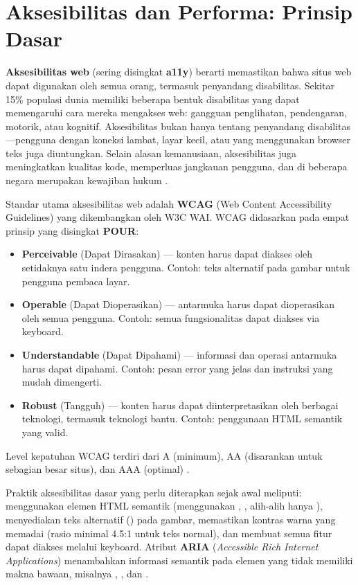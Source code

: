 \section{Aksesibilitas dan Performa: Prinsip Dasar}
\textbf{Aksesibilitas web} (sering disingkat \textbf{a11y}) berarti memastikan bahwa situs web dapat digunakan oleh semua orang, termasuk penyandang disabilitas. Sekitar 15\% populasi dunia memiliki beberapa bentuk disabilitas yang dapat memengaruhi cara mereka mengakses web: gangguan penglihatan, pendengaran, motorik, atau kognitif. Aksesibilitas bukan hanya tentang penyandang disabilitas---pengguna dengan koneksi lambat, layar kecil, atau yang menggunakan browser teks juga diuntungkan. Selain alasan kemanusiaan, aksesibilitas juga meningkatkan kualitas kode, memperluas jangkauan pengguna, dan di beberapa negara merupakan kewajiban hukum \cite{mdnAccessibility}.

Standar utama aksesibilitas web adalah \textbf{WCAG} (Web Content Accessibility Guidelines) yang dikembangkan oleh W3C WAI. WCAG didasarkan pada empat prinsip yang disingkat \textbf{POUR}:
\begin{itemize}
  \item \textbf{Perceivable} (Dapat Dirasakan) --- konten harus dapat diakses oleh setidaknya satu indera pengguna. Contoh: teks alternatif pada gambar untuk pengguna pembaca layar.
  \item \textbf{Operable} (Dapat Dioperasikan) --- antarmuka harus dapat dioperasikan oleh semua pengguna. Contoh: semua fungsionalitas dapat diakses via keyboard.
  \item \textbf{Understandable} (Dapat Dipahami) --- informasi dan operasi antarmuka harus dapat dipahami. Contoh: pesan error yang jelas dan instruksi yang mudah dimengerti.
  \item \textbf{Robust} (Tangguh) --- konten harus dapat diinterpretasikan oleh berbagai teknologi, termasuk teknologi bantu. Contoh: penggunaan HTML semantik yang valid.
\end{itemize}
Level kepatuhan WCAG terdiri dari A (minimum), AA (disarankan untuk sebagian besar situs), dan AAA (optimal) \cite{webdevAccessibility}.

Praktik aksesibilitas dasar yang perlu diterapkan sejak awal meliputi: menggunakan elemen HTML semantik (menggunakan , ,  alih-alih hanya ), menyediakan teks alternatif () pada gambar, memastikan kontras warna yang memadai (rasio minimal 4.5:1 untuk teks normal), dan membuat semua fitur dapat diakses melalui keyboard. Atribut \textbf{ARIA} (\textit{Accessible Rich Internet Applications}) menambahkan informasi semantik pada elemen yang tidak memiliki makna bawaan, misalnya , , dan  \cite{mdnAccessibility}.

